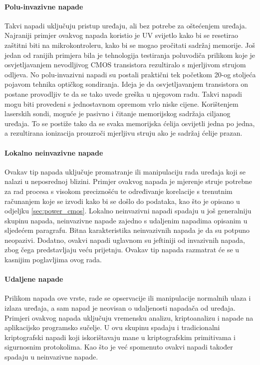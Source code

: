 \documentclass[times, utf8, diplomski]{fer}
\begin{document}
\paragraph{Polu-invazivne napade }
Takvi napadi uključuju pristup uređaju, ali bez potrebe za oštećenjem uređaja. Najraniji primjer ovakvog napada koristio je UV svijetlo kako bi se resetirao zaštitni biti na mikrokontroleru, kako bi se mogao pročitati sadržaj memorije. Još jedan od ranijih primjera bila je tehnologija testiranja poluvodiča prilikom koje je osvjetljavanjem nevodljivog CMOS transistora rezultiralo s mjerljivom strujom odljeva. No polu-invazivni napadi su postali praktični tek početkom 20-og stoljeća pojavom tehnika optičkog sondiranja. Ideja je da osvjetljavanjem transistora on postane provodljiv te da se tako uvede greška u njegovom radu. Takvi napadi mogu biti provedeni s jednostavnom opremom vrlo niske cijene. Korištenjem laserskih sondi, moguće je pasivno i čitanje memorijskog sadržaja ciljanog uređaja. To se postiže tako da se svaka memorijska ćelija osvijetli jedna po jedna, a rezultirana ionizacija prouzroči mjerljivu struju ako je sadržaj ćelije prazan.

\paragraph{Lokalno neinvazivne napade } Ovakav tip napada uključuje promatranje ili manipulaciju rada uređaja koji se nalazi u neposrednoj blizini. Primjer ovakvog napada je mjerenje struje potrebne za rad procesa s visokom preciznošću te određivanje korelacije s trenutnim računanjem koje se izvodi kako bi se došlo do podataka, kao što je opisano u odjeljku \ref{sec:power_cmos}. Lokalno neinvazivni napadi spadaju u još generalniju skupinu napada, neinvazivne napade  zajedno s udaljenim napadima opisanim u sljedećem paragrafu. Bitna karakteristika neinvazivnih napada je da su potpuno neopazivi. Dodatno, ovakvi napadi uglavnom su jeftiniji od invazivnih napada, zbog čega predstavljaju veću prijetnju. Ovakav tip napada razmatrat će se u kasnijim poglavljima ovog rada.

\paragraph{Udaljene napade } Prilikom napada ove vrste, rade se opservacije ili manipulacije normalnih ulaza i izlaza uređaja, a sam napad je neovisan o udaljenosti napadača od uređaja. Primjeri ovakvog napada uključuju vremensku analizu, kriptoanalizu i napade na aplikacijsko programsko sučelje. U ovu skupinu spadaju i tradicionalni kriptografski napadi koji iskorištavaju mane u kriptografskim primitivama i sigurnosnim protokolima. Kao što je već spomenuto ovakvi napadi također spadaju u neinvazivne napade.
\end{document}
